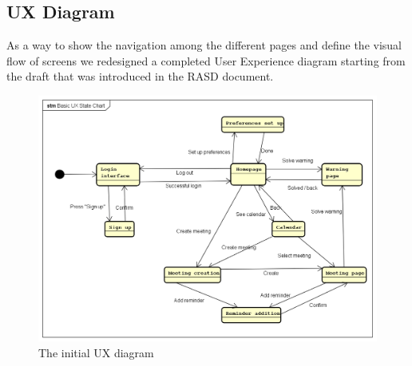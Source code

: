 \subsection{UX Diagram}
As a way to show the navigation among the different pages and define the visual flow of screens we redesigned a completed User Experience diagram starting from the draft that was introduced in the RASD document.

\begin{center}
\begin{figure}[htp] 
\includegraphics[width=\textwidth]{images/basicux} 
\caption{The initial UX diagram} 
\label{fig:basicux} 
\end{figure} 
\end{center}


